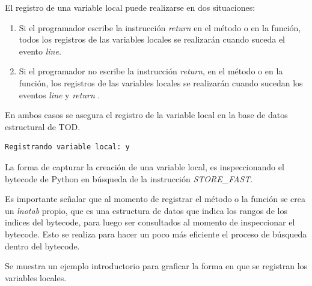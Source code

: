 \documentclass[12pt,legalpaper]{report}
\begin{document}
El registro de una variable local puede realizarse en dos situaciones:

\begin{enumerate}
	\item Si el programador escribe la instrucción \textit{return} en el método o en la función, todos los registros de las variables locales se realizarán cuando suceda el evento \textit{line}.
	\item Si el programador no escribe la instrucción \textit{return}, en el método o en la función, los registros de las variables locales se realizarán cuando sucedan los eventos \textit{line} y \textit{return} \cite{bytecode}.
\end{enumerate}

En ambos casos se asegura el registro de la variable local en la base de datos estructural de TOD.

\begin{singlespace}
\begin{lstlisting}[style=Python]
Registrando variable local: y
\end{lstlisting}
\end{singlespace}

La forma de capturar la creación de una variable local, es inspeccionando el bytecode de Python en búsqueda de la instrucción \textit{STORE\_FAST}. \cite{bytecode}

Es importante señalar que al momento de registrar el método o la función se crea un \textit{lnotab} \cite{lnotab} propio, que es una estructura de datos que indica los rangos de los indices del bytecode, para luego ser consultados al momento de inspeccionar el bytecode.  Esto se realiza para hacer un poco más eficiente el proceso de búsqueda dentro del bytecode.

Se muestra un ejemplo introductorio para graficar la forma en que se registran los variables locales.
\end{document}
